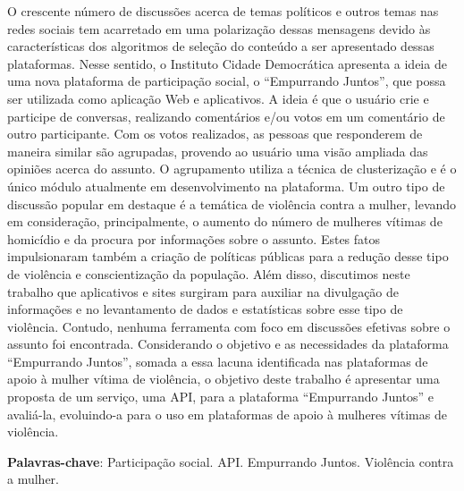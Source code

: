\begin{resumo}
O crescente número de discussões acerca de temas políticos e outros temas nas redes sociais tem acarretado em uma polarização 
dessas mensagens devido às características dos algoritmos de seleção do conteúdo a ser apresentado dessas plataformas. 
Nesse sentido, o Instituto Cidade Democrática 
apresenta a ideia de uma nova plataforma de participação social, o ``Empurrando Juntos'', que possa ser utilizada como aplicação Web e aplicativos. 
A ideia é que o 
usuário crie e participe de conversas, realizando comentários e/ou votos em um comentário de outro participante. Com os votos realizados, as pessoas que 
responderem de maneira similar são agrupadas, provendo ao usuário uma visão ampliada das opiniões acerca do assunto. O agrupamento utiliza a técnica de 
clusterização e é o único módulo atualmente em desenvolvimento na plataforma. Um outro tipo de discussão popular em destaque é a 
temática de violência 
contra a mulher, levando em consideração, principalmente, o aumento do número de mulheres vítimas de homicídio e da procura por informações sobre o assunto. 
Estes fatos impulsionaram também a criação de políticas públicas para a redução desse tipo de violência e conscientização da população. 
Além disso, discutimos neste trabalho que aplicativos e sites surgiram para auxiliar na divulgação de informações e no 
levantamento de dados e estatísticas sobre esse tipo de violência. 
Contudo, nenhuma ferramenta com foco em discussões efetivas sobre o assunto foi encontrada. Considerando 
o objetivo e as necessidades da plataforma ``Empurrando Juntos'', somada a essa lacuna identificada nas plataformas de apoio à mulher
vítima de violência, o objetivo deste trabalho é apresentar uma proposta de um serviço, uma API, 
para a plataforma 
``Empurrando Juntos'' e avaliá-la, evoluindo-a para o uso em plataformas de apoio à mulheres vítimas de violência. 
\vspace{\onelineskip}
  
\noindent
\textbf{Palavras-chave}: Participação social. API. Empurrando Juntos. Violência contra a mulher.
\end{resumo}
